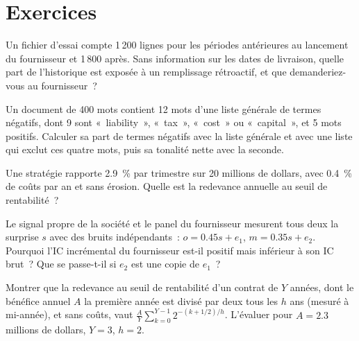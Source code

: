 \section{Exercices}

\begin{exercise}[$\star$]\label{exo:rs:alternative-and-text-data:1}
Un fichier d'essai compte 1\,200 lignes pour les périodes antérieures au lancement du fournisseur et 1\,800 après. Sans information sur les dates de livraison, quelle part de
l'historique est exposée à un remplissage rétroactif, et que demanderiez-vous au fournisseur~?
\end{exercise}

\begin{exercise}[$\star$]\label{exo:rs:alternative-and-text-data:2}
Un document de 400 mots contient 12 mots d'une liste générale de termes négatifs, dont 9 sont «~liability~», «~tax~», «~cost~» ou «~capital~», et 5 mots positifs.
Calculer sa part de termes négatifs avec la liste générale et avec une liste qui exclut ces quatre mots, puis sa tonalité nette avec la seconde.
\end{exercise}

\begin{exercise}[$\star$]\label{exo:rs:alternative-and-text-data:3}
Une stratégie rapporte 2.9~\% par trimestre sur 20 millions de dollars, avec 0.4~\% de coûts par an et sans érosion. Quelle est la redevance annuelle au seuil de rentabilité~?
\end{exercise}

\begin{exercise}[$\star\star$]\label{exo:rs:alternative-and-text-data:4}
Le signal propre de la société et le panel du fournisseur mesurent tous deux la surprise $s$ avec des bruits indépendants~: $o = 0.45s + e_1$, $m = 0.35s + e_2$. Pourquoi
l'IC incrémental du fournisseur est-il positif mais inférieur à son IC brut~? Que se passe-t-il si $e_2$ est une copie de $e_1$~?
\end{exercise}

\begin{exercise}[$\star\star$]\label{exo:rs:alternative-and-text-data:5}
Montrer que la redevance au seuil de rentabilité d'un contrat de $Y$ années, dont le bénéfice annuel $A$ la première année est divisé par deux tous les $h$ ans (mesuré à mi-année), et sans
coûts, vaut $\frac{A}{Y}\sum_{k=0}^{Y-1} 2^{-(k+1/2)/h}$. L'évaluer pour $A = 2.3$ millions de dollars, $Y = 3$, $h = 2$.
\end{exercise}

